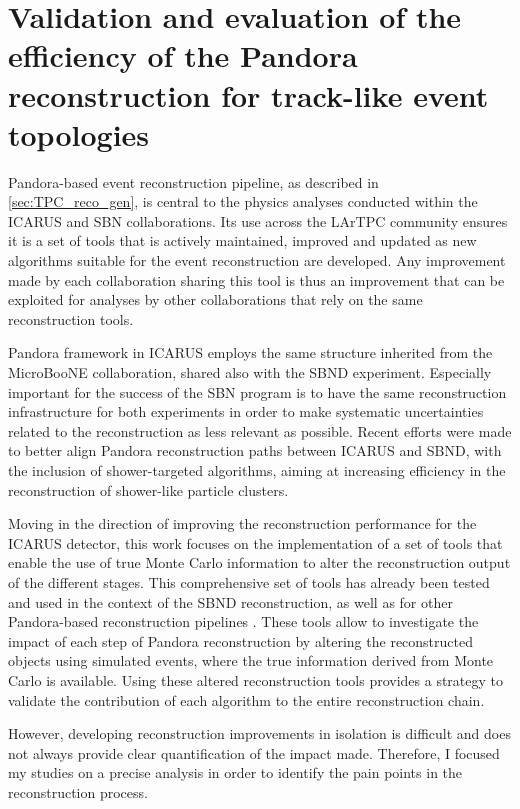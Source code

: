 
\chapter[Validating and evaluating the efficiency of Pandora reconstruction]{Validation and evaluation of the efficiency of the Pandora reconstruction for track-like event topologies}\label{chap:methods}

Pandora-based event reconstruction pipeline, as described in \autoref{sec:TPC_reco_gen}, is central to the physics analyses conducted within the ICARUS and SBN collaborations. Its use across the LArTPC community ensures it is a set of tools that is actively maintained, improved and updated as new algorithms suitable for the event reconstruction are developed. Any improvement made by each collaboration sharing this tool is thus an improvement that can be exploited for analyses by other collaborations that rely on the same reconstruction tools.

Pandora framework in ICARUS employs the same structure inherited from the MicroBooNE collaboration, shared also with the SBND experiment. Especially important for the success of the SBN program is to have the same reconstruction infrastructure for both experiments in order to make systematic uncertainties related to the reconstruction as less relevant as possible.  Recent efforts were made to better align Pandora reconstruction paths between ICARUS and SBND, with the inclusion of shower-targeted algorithms, aiming at increasing efficiency in the reconstruction of shower-like particle clusters. 

Moving in the direction of improving the reconstruction performance for the ICARUS detector, this work focuses on the implementation of a set of tools that enable the use of true Monte Carlo information to alter the reconstruction output of the different stages. This comprehensive set of tools has already been tested and used in the context of the SBND reconstruction, as well as for other Pandora-based reconstruction pipelines \cite{Mawby:2023nws, Nguyen:2023_cheatingPandora}. These tools allow to investigate the impact of each step of Pandora reconstruction by altering the reconstructed objects using simulated events, where the true information derived from Monte Carlo is available. Using these altered reconstruction tools provides a strategy to validate the contribution of each algorithm to the entire reconstruction chain. 

However, developing reconstruction improvements in isolation is difficult and does not always provide clear quantification of the impact made. 
Therefore, I focused my studies on a precise analysis in order to identify the pain points in the reconstruction process. 


